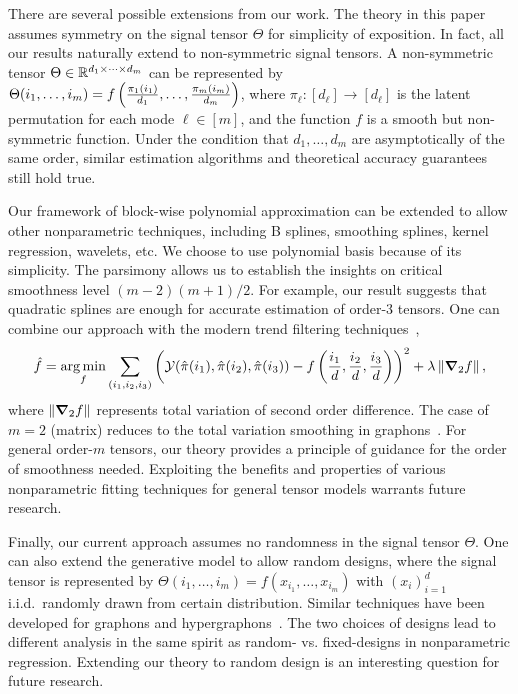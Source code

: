 \documentclass[11pt]{article}
\theoremstyle{definition}
\begin{document}
There are several possible extensions from our work. The theory in this paper assumes symmetry on the signal tensor $\Theta$ for simplicity of exposition. In fact, all our results naturally extend to non-symmetric signal tensors. A non-symmetric tensor $\Theta\in\mathbb{R}^{d_1\times \cdots\times d_m}$ can be represented by $\Theta(i_1,\ldots,i_m) = f\left({\pi_1(i_1)\over d_1},\ldots,{\pi_m(i_m)\over d_m}\right)$, where $\pi_\ell\colon [d_\ell]\rightarrow [d_\ell]$ is the latent permutation for each mode $\ell\in[m]$, and the function $f$ is a smooth but non-symmetric function. Under the condition that $d_1,\ldots, d_m$ are asymptotically of the same order, similar estimation algorithms and theoretical accuracy guarantees still hold true.  

Our framework of block-wise polynomial approximation can be extended to allow other nonparametric techniques, including B splines, smoothing splines, kernel regression, wavelets, etc. We choose to use polynomial basis because of its simplicity. The parsimony allows us to establish the insights on critical smoothness level $ (m-2)(m+1)/2$. For example, our result suggests that quadratic splines are enough for accurate estimation of order-3 tensors. One can combine our approach with the modern trend filtering techniques~\citep{tibshirani2014adaptive,ortelli2019prediction},
\[
\hat f =\operatorname*{arg\,min}_{f}\sum_{(i_1,i_2,i_3)}\left(\mathcal{Y}(\hat \pi(i_1),\hat \pi(i_2),\hat \pi(i_3))-f\left({i_1\over d},{i_2\over d},{i_3\over d}\right)\right)^2+\lambda \left\lVert{\boldsymbol \nabla}_2 f\right\rVert,
\]
where $\left\lVert{\boldsymbol \nabla}_2 f\right\rVert$ represents total variation of second order difference. The case of $m=2$ (matrix) reduces to the total variation smoothing in graphons~\citep{chan2014consistent}. For general order-$m$ tensors, our theory provides a principle of guidance for the order of smoothness needed. Exploiting the benefits and properties of various nonparametric fitting techniques for general tensor models warrants future research.

Finally, our current approach assumes no randomness in the signal tensor $\Theta$. One can also extend the generative model to allow random designs, where the signal tensor is represented by $\Theta(i_1,\ldots,i_m)=f(x_{i_1},\ldots,x_{i_m})$ with $(x_i)_{i=1}^d$ i.i.d.\ randomly drawn from certain distribution. Similar techniques have been developed for graphons and hypergraphons~\citep{chan2014consistent,gao2015rate,klopp2017oracle,balasubramanian2021nonparametric}. The two choices of designs lead to different analysis in the same spirit as random- vs. fixed-designs in nonparametric regression. Extending our theory to random design is an interesting question for future research.
\end{document}

